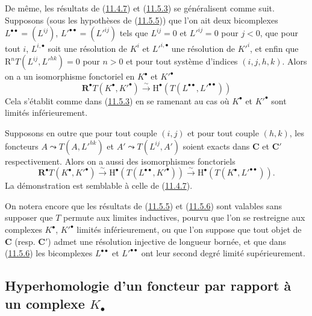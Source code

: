 \begin{env}[11.5.6]
\label{0.11.5.6-fr}
De même, les résultats de (\hyperref[0.11.4.7-fr]{11.4.7}) et
(\hyperref[0.11.5.3-fr]{11.5.3}) se généralisent comme suit. Supposons (sous
les hypothèses de (\hyperref[0.11.5.5-fr]{11.5.5})) que l'on ait deux
bicomplexes $L^{\bullet\bullet}=(L^{ij})$,
$L'^{\bullet\bullet}=(L'^{ij})$ tels que $L^{ij}=0$ et $L'^{ij}=0$ pour
$j<0$, que pour tout $i$, $L^{i,\bullet}$ soit une résolution de $K^i$ et
$L'^{i,\bullet}$ une résolution de $K'^i$, et enfin que
$\mathrm R^nT(L^{ij},L'^{hk})=0$ pour $n>0$ et pour tout système d'indices
$(i,j,h,k)$. Alors on a un isomorphisme fonctoriel en $K^\bullet$ et
$K'^\bullet$
\[
  \label{0.11.5.6.1-fr}
  \mathbf R^\bullet T(K^\bullet,K'^\bullet)\xrightarrow{\sim}
  \mathrm H^\bullet(T(L^{\bullet\bullet},L'^{\bullet\bullet}))
  \tag{11.5.6.1}
\]
Cela s'établit comme dans (\hyperref[0.11.5.3-fr]{11.5.3}) en se ramenant au
cas où $K^\bullet$ et $K'^\bullet$ sont limités inférieurement.

Supposons en outre que pour tout couple $(i,j)$ et pour tout couple $(h,k)$,
les foncteurs $A\leadsto T(A,L'^{hk})$ et $A'\leadsto T(L^{ij},A')$ soient
exacts dans $\boldsymbol{C}$ et $\boldsymbol{C}'$ respectivement. Alors on a aussi des
isomorphismes fonctoriels
\[
  \label{0.11.5.6.2-fr}
  \mathbf R^\bullet T(K^\bullet,K'^\bullet)
  \xrightarrow{\sim}\mathrm H^\bullet(T(L^{\bullet\bullet},K'^\bullet))
  \xrightarrow{\sim}\mathrm H^\bullet(T(K^\bullet,L'^{\bullet\bullet})).
  \tag{11.5.6.2}
\]
La démonstration est semblable à celle de
(\hyperref[0.11.4.7-fr]{11.4.7}).
\end{env}

\begin{env}[11.5.7]
\label{0.11.5.7-fr}
On notera encore que les résultats de (\hyperref[0.11.5.5-fr]{11.5.5}) et
(\hyperref[0.11.5.6-fr]{11.5.6}) sont valables sans supposer que $T$ permute
aux limites inductives, pourvu que l'on se restreigne aux complexes
$K^\bullet$, $K'^\bullet$ limités inférieurement, ou que l'on suppose que tout
objet de $\boldsymbol{C}$ (resp. $\boldsymbol{C}'$) admet une résolution injective de
longueur bornée, et que dans (\hyperref[0.11.5.6-fr]{11.5.6}) les bicomplexes
$L^{\bullet\bullet}$ et $L'^{\bullet\bullet}$ ont leur second degré limité
supérieurement.
\end{env}

\subsection{Hyperhomologie d'un foncteur par rapport à un complexe
$K_\bullet$}
\label{subsection:0.11.6-fr}

